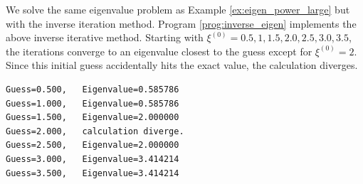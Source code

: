 {\bigskip
\begin{samepage}
\begin{center}
\end{center}
\end{samepage}



\bigskip

\medskip
\begin{example}

We solve the same eigenvalue problem as Example \ref{ex:eigen_power_large} but with the inverse iteration method.
Program \ref{prog:inverse_eigen} implements the above inverse iterative method. Starting with $\xi^{(0)}=0.5,1,1.5,2.0,2.5,3.0,3.5$, the iterations converge to an eigenvalue closest to the guess except for
$\xi^{(0)}=2$.  Since this initial guess accidentally hits the exact value, the calculation diverges.

\begin{center}
\begin{minipage}[t]{0.45\textwidth}
\begin{Verbatim}[frame=single]
Guess=0.500,   Eigenvalue=0.585786 
Guess=1.000,   Eigenvalue=0.585786 
Guess=1.500,   Eigenvalue=2.000000 
Guess=2.000,   calculation diverge.
Guess=2.500,   Eigenvalue=2.000000 
Guess=3.000,   Eigenvalue=3.414214 
Guess=3.500,   Eigenvalue=3.414214 
\end{Verbatim}
\end{minipage}
\end{center}
\end{example}

}
